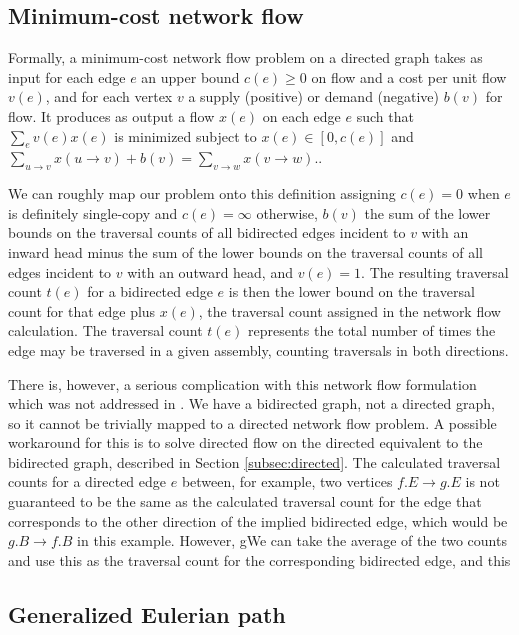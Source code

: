 \documentclass[12pt]{article}
\newcommand{\Subsection}[1]{Section \ref{#1}}
\begin{document}
\label{sec:mapping_contained_reads}

\subsection{Minimum-cost network flow}

Formally, a minimum-cost network flow problem on a directed graph takes as input
for each edge $e$ an upper bound $c(e) \ge 0$ on flow and a cost per unit flow
$v(e)$, and for each vertex $v$ a supply (positive) or demand (negative)
$b(v)$ for flow.  It produces as output a flow $x(e)$ on each edge $e$ such
that $\sum_e v(e)x(e)$ is minimized subject to $x(e) \in [0, c(e)]$ and
$\sum_{u \to v}x(u \to v) + b(v) = \sum_{v \to w} x(v \to w)$.\cite{Myers2005}.

We can roughly map our problem onto this definition assigning $c(e) = 0$ when
$e$ is definitely single-copy and $c(e) = \infty$ otherwise, $b(v)$ the sum
of the lower bounds on the traversal counts of all bidirected edges incident to
$v$ with an inward head minus the sum of the lower bounds on the traversal
counts of all edges incident to $v$ with an outward head, and $v(e) = 1$.  The
resulting traversal count $t(e)$ for a bidirected edge $e$ is then the lower
bound on the traversal count for that edge plus $x(e)$, the traversal count
assigned in the network flow calculation.  The traversal count $t(e)$ represents
the total number of times the edge may be traversed in a given assembly,
counting traversals in both directions.

There is, however, a serious complication with this network flow formulation
which was not addressed in \cite{Myers2005}.  We have a bidirected graph, not a
directed graph, so it cannot be trivially mapped to a directed network flow
problem.  A possible workaround for this is to solve directed flow on the
directed equivalent to the bidirected graph, described in
\Subsection{subsec:directed}.  The calculated traversal counts for a directed
edge $e$ between, for example, two vertices $f.E \to g.E$ is not guaranteed to
be the same as the calculated traversal count for the edge that corresponds to
the other direction of the implied bidirected edge, which would be $g.B \to f.B$
in this example.  However, gWe can take the average of the two counts and use this as the
traversal count for the corresponding bidirected edge, and this 


\subsection{Generalized Eulerian path}
\end{document}
